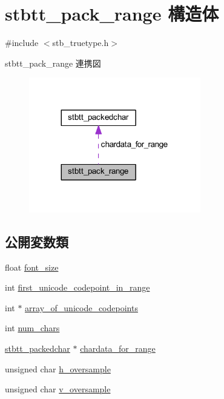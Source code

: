 \hypertarget{structstbtt__pack__range}{}\section{stbtt\+\_\+pack\+\_\+range 構造体}
\label{structstbtt__pack__range}


{\ttfamily \#include $<$stb\+\_\+truetype.\+h$>$}



stbtt\+\_\+pack\+\_\+range 連携図\nopagebreak
\begin{figure}[H]
\begin{center}
\leavevmode
\includegraphics[width=212pt]{structstbtt__pack__range__coll__graph}
\end{center}
\end{figure}
\subsection*{公開変数類}
\begin{DoxyCompactItemize}
\item 
float \mbox{\hyperlink{structstbtt__pack__range_a296916dc971e5e7627822fe98dc42828}{font\+\_\+size}}
\item 
int \mbox{\hyperlink{structstbtt__pack__range_a3b414cbee1e164c29dd138e0ae3d5759}{first\+\_\+unicode\+\_\+codepoint\+\_\+in\+\_\+range}}
\item 
int $\ast$ \mbox{\hyperlink{structstbtt__pack__range_a1567aa5455e1251529a91b46261368cf}{array\+\_\+of\+\_\+unicode\+\_\+codepoints}}
\item 
int \mbox{\hyperlink{structstbtt__pack__range_a046d65b6ffb65fb998d471ba098e2e23}{num\+\_\+chars}}
\item 
\mbox{\hyperlink{structstbtt__packedchar}{stbtt\+\_\+packedchar}} $\ast$ \mbox{\hyperlink{structstbtt__pack__range_aa8f7ddd637ed341ea39b08466fab9284}{chardata\+\_\+for\+\_\+range}}
\item 
unsigned char \mbox{\hyperlink{structstbtt__pack__range_a7a642139ce446c58fde5c48553bcf008}{h\+\_\+oversample}}
\item 
unsigned char \mbox{\hyperlink{structstbtt__pack__range_a6288f14006e257544db3d015c32b4113}{v\+\_\+oversample}}
\end{DoxyCompactItemize}


